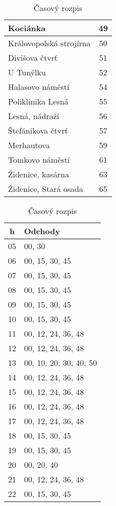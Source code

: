 \begin{table}[h]
\begin{minipage}{0.35\textwidth}
\begin{tabular}{|l|c|}
      Kociánka & 49 \\ \hline
      Královopolská strojírna & 50 \\ \hline
      Divišova čtvrť & 51 \\ \hline
      U Tunýlku & 52 \\ \hline
      Halasovo náměstí & 54 \\ \hline
      Poliklinika Lesná & 55 \\ \hline
      Lesná, nádraží & 56 \\ \hline
      Štefánikova čtvrť & 57 \\ \hline
      Merhautova & 59 \\ \hline
      Tomkovo náměstí & 61 \\ \hline
      Židenice, kasárna & 63 \\ \hline
      Židenice, Stará osada & 65 \\ \hline
    \end{tabular}
    \caption{Rozpis zastávok}      
  \end{minipage}
  \begin{minipage}{0.55\textwidth}
    \centering
    \begin{tabular}{|c|l|}
      \hline
      \textbf{h} & \textbf{Odchody} \\ \hline
      05 & 00, 30 \\ \hline
      06 & 00, 15, 30, 45 \\ \hline
      07 & 00, 15, 30, 45 \\ \hline
      08 & 00, 15, 30, 45 \\ \hline
      09 & 00, 15, 30, 45 \\ \hline
      10 & 00, 15, 30, 45 \\ \hline
      11 & 00, 12, 24, 36, 48 \\ \hline
      12 & 00, 12, 24, 36, 48 \\ \hline
      13 & 00, 10, 20, 30, 40, 50 \\ \hline
      14 & 00, 12, 24, 36, 48 \\ \hline
      15 & 00, 12, 24, 36, 48 \\ \hline
      16 & 00, 12, 24, 36, 48 \\ \hline
      17 & 00, 12, 24, 36, 48 \\ \hline
      18 & 00, 15, 30, 45 \\ \hline
      19 & 00, 15, 30, 45 \\ \hline
      20 & 00, 20, 40 \\ \hline
      21 & 00, 12, 24, 36, 48 \\ \hline
      22 & 00, 15, 30, 45 \\ \hline
    \end{tabular}
    \caption{Časový rozpis}
  \end{minipage}
\end{table}
